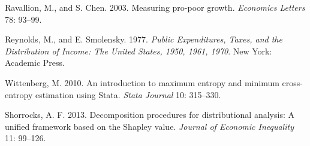 Ravallion, M., and S. Chen. 2003. Measuring pro-poor growth.
\textit{Economics Letters} 78: 93--99.

Reynolds, M., and E. Smolensky. 1977. \textit{Public Expenditures, Taxes, and
the Distribution of Income: The United States, 1950, 1961, 1970}. New York:
Academic Press.

Wittenberg, M. 2010. An introduction to maximum entropy and minimum
cross-entropy estimation using Stata. \textit{Stata Journal} 10: 315--330.

Shorrocks, A. F. 2013. Decomposition procedures for distributional analysis:
A unified framework based on the Shapley value. \textit{Journal of Economic
Inequality} 11: 99--126.


\begin{alsosee}
\end{alsosee}
